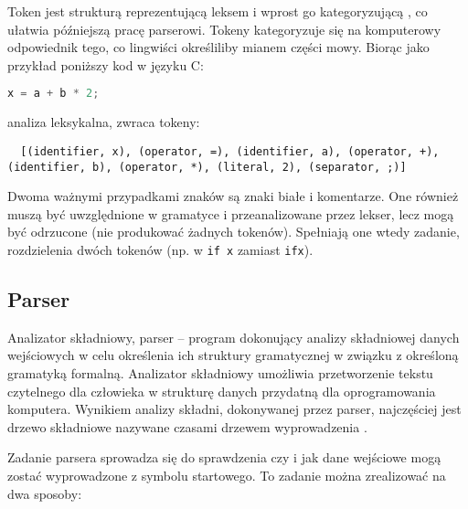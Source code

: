\documentclass{article}
\begin{document}
Token jest strukturą reprezentującą leksem i wprost go kategoryzującą \cite{ Aho__Sethi__Ullman__1985}, co ułatwia późniejszą pracę parserowi. Tokeny kategoryzuje się na komputerowy odpowiednik tego, co lingwiści określiliby mianem części mowy. Biorąc jako przykład poniższy kod w języku C:
\begin{lstlisting}[language=c]
  x = a + b * 2;
\end{lstlisting}
analiza leksykalna, zwraca tokeny:
\begin{lstlisting}
  [(identifier, x), (operator, =), (identifier, a), (operator, +), (identifier, b), (operator, *), (literal, 2), (separator, ;)]
\end{lstlisting}
Dwoma ważnymi przypadkami znaków są znaki białe i komentarze. One również muszą być uwzględnione w gramatyce i przeanalizowane przez lekser, lecz mogą być odrzucone (nie produkować żadnych tokenów). Spełniają one wtedy zadanie, rozdzielenia dwóch tokenów (np. w \lstinline{if x} zamiast \lstinline{ifx}).

\subsection{Parser}
Analizator składniowy, parser – program dokonujący analizy składniowej danych wejściowych w celu określenia ich struktury gramatycznej w związku z określoną gramatyką formalną. Analizator składniowy umożliwia przetworzenie tekstu czytelnego dla człowieka w strukturę danych przydatną dla oprogramowania komputera. Wynikiem analizy składni, dokonywanej przez parser, najczęściej jest drzewo składniowe nazywane czasami drzewem wyprowadzenia \cite{Aho__Sethi__Ullman__1985}.



Zadanie parsera sprowadza się do sprawdzenia czy i jak dane wejściowe mogą zostać wyprowadzone z symbolu startowego. To zadanie można zrealizować na dwa sposoby:
\end{document}
